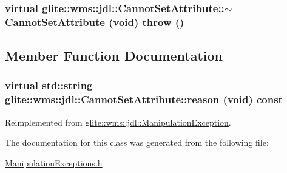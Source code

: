 \hypertarget{classglite_1_1wms_1_1jdl_1_1CannotSetAttribute_a1}{
\subsubsection[$\sim$CannotSetAttribute]{\setlength{\rightskip}{0pt plus 5cm}virtual glite::wms::jdl::Cannot\-Set\-Attribute::$\sim$\hyperlink{classglite_1_1wms_1_1jdl_1_1CannotSetAttribute}{Cannot\-Set\-Attribute} (void)  throw ()}}
\label{classglite_1_1wms_1_1jdl_1_1CannotSetAttribute_a1}




\subsection{Member Function Documentation}
\hypertarget{classglite_1_1wms_1_1jdl_1_1CannotSetAttribute_a2}{
\subsubsection[reason]{\setlength{\rightskip}{0pt plus 5cm}virtual std::string glite::wms::jdl::Cannot\-Set\-Attribute::reason (void) const}}
\label{classglite_1_1wms_1_1jdl_1_1CannotSetAttribute_a2}




Reimplemented from \hyperlink{classglite_1_1wms_1_1jdl_1_1ManipulationException_a4}{glite::wms::jdl::Manipulation\-Exception}.

The documentation for this class was generated from the following file:\begin{CompactItemize}
\item 
\hyperlink{ManipulationExceptions_8h}{Manipulation\-Exceptions.h}\end{CompactItemize}
